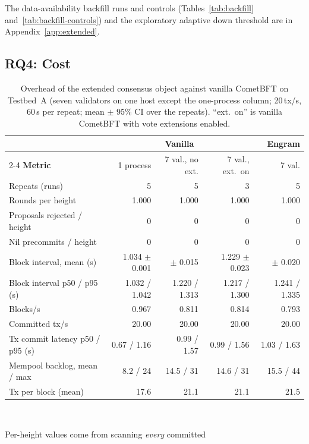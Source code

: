 The data-availability backfill runs and controls (Tables~\ref{tab:backfill} and~\ref{tab:backfill-controls}) and the exploratory adaptive down threshold are in Appendix~\ref{app:extended}.

\subsection{RQ4: Cost}
\label{subsec:rq4}

\begin{table}[tbp]
\caption{Overhead of the extended consensus object against vanilla CometBFT on Testbed~A (seven validators on one host except the one-process column; 20\,tx/s, 60\,s per repeat; mean $\pm$ 95\% CI over the repeats). ``ext.\ on'' is vanilla CometBFT with vote extensions enabled.}
\label{tab:overhead}
\centering
\footnotesize
\begin{tabular}{@{}lrrrr@{}}
\toprule
 & \multicolumn{3}{c}{\textbf{Vanilla}} & \textbf{Engram} \\
\cmidrule(lr){2-4}
\textbf{Metric} & 1 process & 7 val., no ext. & 7 val., ext.\ on & 7 val. \\
\midrule
Repeats (runs) & 5 & 5 & 3 & 5 \\
Rounds per height & 1.000 & 1.000 & 1.000 & 1.000 \\
Proposals rejected / height & 0 & 0 & 0 & 0 \\
Nil precommits / height & 0 & 0 & 0 & 0 \\
Block interval, mean (s) & 1.034 $\pm$ 0.001 & \resBlockVanilla{} $\pm$ 0.015 & 1.229 $\pm$ 0.023 & \resBlockEngram{} $\pm$ 0.020 \\
Block interval p50 / p95 (s) & 1.032 / 1.042 & 1.220 / 1.313 & 1.217 / 1.300 & 1.241 / 1.335 \\
Blocks/s & 0.967 & 0.811 & 0.814 & 0.793 \\
Committed tx/s & 20.00 & 20.00 & 20.00 & 20.00 \\
Tx commit latency p50 / p95 (s) & 0.67 / 1.16 & 0.99 / 1.57 & 0.99 / 1.56 & 1.03 / 1.63 \\
Mempool backlog, mean / max & 8.2 / 24 & 14.5 / 31 & 14.6 / 31 & 15.5 / 44 \\
Tx per block (mean) & 17.6 & 21.1 & 21.1 & 21.5 \\
\bottomrule
\end{tabular}
\\[2pt]
\begin{minipage}{\linewidth}
\raggedright
\footnotesize Per-height values come from scanning \emph{every} committed

\end{minipage}
\end{table}
